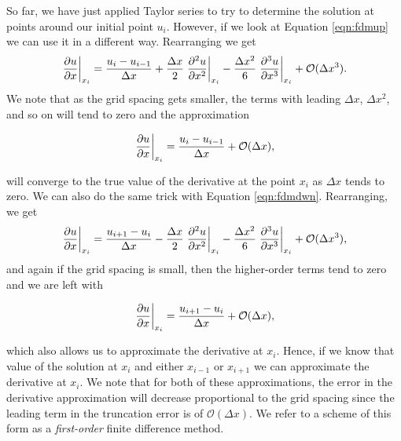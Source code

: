 So far, we have just applied Taylor series to try to determine the solution at points around our initial point $u_i$. However, if we look at Equation \ref{eqn:fdmup} we can use it in a different way. Rearranging we get
\begin{equation}
	\left.\frac{\partial u}{\partial x}\right\rvert_{x_i}^{} = \frac{u_i - u_{i-1}}{\Delta x} + \frac{\Delta x}{2} \left.\frac{\partial^2 u}{\partial x^2}\right\rvert_{x_i}^{} - \frac{\Delta x^2}{6} \left.\frac{\partial^3 u}{\partial x^3}\right\rvert_{x_i}^{} + \mathcal{O}(\Delta x^3).
	\label{eqn:fdmup1}
\end{equation}
We note that as the grid spacing gets smaller, the terms with leading $\Delta x$, $\Delta x^2$, and so on will tend to zero and the approximation
\begin{eqBox}
\begin{equation}
	\left.\frac{\partial u}{\partial x}\right\rvert_{x_i}^{} = \frac{u_i - u_{i-1}}{\Delta x} + \mathcal{O}(\Delta x),
\end{equation}
\end{eqBox}
will converge to the true value of the derivative at the point $x_i$ as $\Delta x$ tends to zero. We can also do the same trick with Equation \ref{eqn:fdmdwn}. Rearranging, we get
\begin{equation}
	\left.\frac{\partial u}{\partial x}\right\rvert_{x_i}^{} = \frac{u_{i+1} - u_{i}}{\Delta x} - \frac{\Delta x}{2} \left.\frac{\partial^2 u}{\partial x^2}\right\rvert_{x_i}^{} - \frac{\Delta x^2}{6} \left.\frac{\partial^3 u}{\partial x^3}\right\rvert_{x_i}^{} + \mathcal{O}(\Delta x^3),
	\label{eqn:fdmdwn1}
\end{equation}
and again if the grid spacing is small, then the higher-order terms tend to zero and we are left with
\begin{eqBox}
\begin{equation}
	\left.\frac{\partial u}{\partial x}\right\rvert_{x_i}^{} = \frac{u_{i+1} - u_{i}}{\Delta x} + \mathcal{O}(\Delta x),
\end{equation}
\end{eqBox}
which also allows us to approximate the derivative at $x_i$. Hence, if we know that value of the solution at $x_i$ and either $x_{i-1}$ or $x_{i+1}$ we can approximate the derivative at $x_i$. We note that for both of these approximations, the error in the derivative approximation will decrease proportional to the grid spacing since the leading term in the truncation error is of $\mathcal{O}(\Delta x)$. We refer to a scheme of this form as a {\it first-order} finite difference method.

